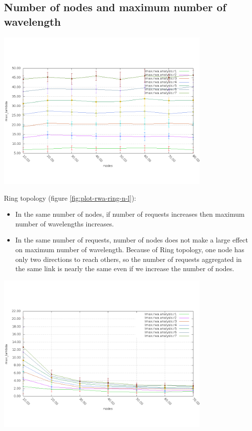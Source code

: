 \documentclass[a4paper]{article}
\begin{document}
\subsection{Number of nodes and maximum number of wavelength}
    \begin{center}
    \includegraphics[width=0.8\textwidth]{rwa-ring-results/plot_rwa_n_l.png}
    \label{fig:plot-rwa-ring-n-l}
    \end{center}
Ring topology (figure \ref{fig:plot-rwa-ring-n-l}):
\begin{itemize}
  \item In the same number of nodes, if number of requests increases then maximum number of wavelengths increases.
	\item In the same number of requests, number of nodes does not make a large effect on maximum number of wavelength. Because of Ring topology, one node has only two directions to reach others, so the number of requests aggregated in the same link is nearly the same even if we increase the number of nodes.
\end{itemize}

    \begin{center}
    \includegraphics[width=0.8\textwidth]{rwa-prob-results/plot_rwa_n_l.png}
    \label{fig:plot-rwa-prob-n-l}
    \end{center}
\end{document}
